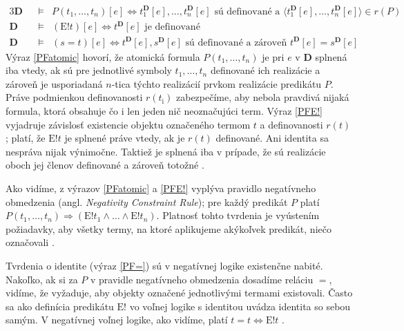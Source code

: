 \documentclass[12pt, letterpaper]{article}
\begin{document}
\begin{alignat}{3}  
    \mathbf{D} &&\models& P(t_1,\dots, t_n)[e]\iff t_{1}^{\mathbf{D}}[e],\dots, t_{n}^{\mathbf{D}}[e] \text{ sú definované a } \langle t_{1}^{\mathbf{D}}[e],\dots, t_{n}^{\mathbf{D}}[e]\rangle \in r(P)  \label{PFatomic}\\
    \mathbf{D} &&\models&(\text{E}!t)[e]\iff t^{\mathbf{D}}[e] \text{ je definované} \label{PFE!}\\
    \mathbf{D} &&\models&(s=t)[e]\iff t^{\mathbf{D}}[e], s^{\mathbf{D}}[e] \text{ sú definované a zároveň } t^{\mathbf{D}}[e] = s^{\mathbf{D}}[e] \label{PF=}
\end{alignat}
\noindent Výraz \ref{PFatomic} hovorí, že atomická formula $P(t_1,\dots, t_n)$ je pri $e$ v \textbf{D} splnená iba vtedy, ak sú pre jednotlivé symboly $t_1,\dots,t_n$ definované ich realizácie a zároveň je usporiadaná $n$-tica týchto realizácií prvkom realizácie predikátu $P$. Práve podmienkou definovanosti $r(t_\text{i})$ zabezpečíme, aby nebola pravdivá nijaká formula, ktorá obsahuje čo i len jeden nič neoznačujúci term. Výraz \ref{PFE!} vyjadruje závislosť existencie objektu označeného termom $t$ a definovanosti $r(t)$; platí, že $\text{E}!t$ je splnené práve vtedy, ak je $r(t)$ definované. Ani identita sa nespráva nijak výnimočne. Taktiež je splnená iba v prípade, že sú realizácie oboch jej členov definované a zároveň totožné \parencites[156]{Dumitru2015}[12]{Morscher2001}{sep-logic-free}.\par
Ako vidíme, z výrazov \ref{PFatomic} a \ref{PFE!} vyplýva pravidlo negatívneho obmedzenia (angl. \textit{Negativity Constraint Rule}); pre každý predikát $P$ platí $P(t_1,\dots, t_n) \Rightarrow (\text{E}!t_1 \land \dots \land \text{E}!t_n)$. Platnosť tohto tvrdenia je vyústením požiadavky, aby všetky termy, na ktoré aplikujeme akýkoľvek predikát, niečo označovali \parencites[]{sep-logic-free}[293--294]{Priest_2008}.\par
Tvrdenia o identite (výraz \ref{PF=}) sú v negatívnej logike existenčne nabité. Nakoľko, ak si za $P$ v pravidle negatívneho obmedzenia dosadíme reláciu $=$, vidíme, že vyžaduje, aby objekty označené jednotlivými termami existovali. Často sa ako definícia predikátu $\text{E}!$ vo voľnej logike s identitou uvádza identita so sebou samým. V negatívnej voľnej logike, ako vidíme, platí $t=t \iff \text{E}!t$ \parencites[25]{LambertE!}[]{sep-logic-free}.\par
\end{document}
